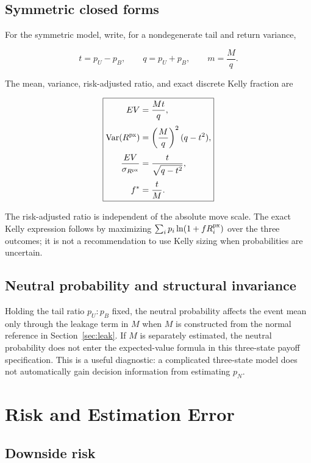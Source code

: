 \subsection{Symmetric closed forms}

For the symmetric model, write, for a nondegenerate tail and return variance,

\[
t=p_U-p_B,
\qquad
q=p_U+p_B,
\qquad
m=\frac{M}{q}.
\]

The mean, variance, risk-adjusted ratio, and exact discrete Kelly fraction are

\[
\boxed{
\begin{aligned}
EV&=\frac{Mt}{q},\\[3pt]
\operatorname{Var}(R^{\mathrm{px}})&=\left(\frac{M}{q}\right)^2(q-t^2),\\[3pt]
\frac{EV}{\sigma_{R^{\mathrm{px}}}}&=\frac{t}{\sqrt{q-t^2}},\\[3pt]
f^*&=\frac{t}{M}.
\end{aligned}}
\]

The risk-adjusted ratio is independent of the absolute move scale. The exact
Kelly expression follows by maximizing
$\sum_i p_i\ln(1+fR^{\mathrm{px}}_i)$ over the three outcomes; it is not a recommendation
to use Kelly sizing when probabilities are uncertain.

\subsection{Neutral probability and structural invariance}

Holding the tail ratio $p_U:p_B$ fixed, the neutral probability affects the
event mean only through the leakage term in $M$ when $M$ is constructed from the
normal reference in Section~\ref{sec:leak}. If $M$ is separately estimated, the
neutral probability does not enter the expected-value formula in this
three-state payoff specification. This is a useful diagnostic: a complicated
three-state model does not automatically gain decision information from
estimating $p_N$.

\section{Risk and Estimation Error}
\label{sec:error}

\subsection{Downside risk}

